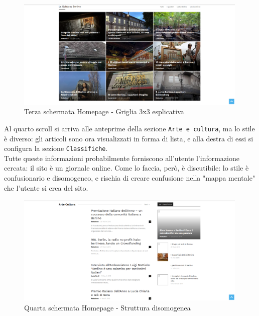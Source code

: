 \vspace{30pt}
\begin{figure}[htbp]
\begin{center}
\includegraphics[width=30em]{img/home3}
\caption{Terza schermata Homepage - Griglia 3x3 esplicativa}
\end{center}
\end{figure}
\vspace{30pt}


Al quarto scroll si arriva alle anteprime della sezione \texttt{Arte e cultura}, ma lo stile è diverso: gli articoli sono ora visualizzati in forma di lista, e alla destra di essi si configura la sezione \texttt{Classifiche}. \\
Tutte queste informazioni probabilmente forniscono all'utente l'informazione cercata: il sito è un giornale online. Come lo faccia, però, è discutibile: lo stile è confusionario e disomogeneo, e rischia di creare confusione nella "mappa mentale" che l'utente si crea del sito. \\

\vspace{30pt}
\begin{figure}[htbp]
\begin{center}
\includegraphics[width=30em]{img/home4}
\caption{Quarta schermata Homepage - Struttura disomogenea}
\end{center}
\end{figure}
\vspace{30pt}


